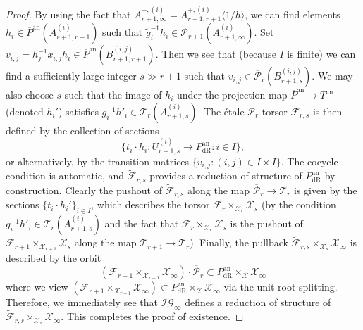 \documentclass[10pt, oneside]{amsart}
\renewcommand{\tilde}{\widetilde}
\numberwithin{equation}{subsection}
\theoremstyle{definition}
\theoremstyle{remark}
\newcommand{\opn}[1]{\operatorname{#1}}
\begin{document}
\begin{proof}
    By using the fact that $A^{+,(i)}_{r+1, \infty} = A^{+,(i)}_{r+1, r+1}\langle 1/h \rangle$, we can find elements $h_i \in \overline{P}^{\opn{an}}(A_{r+1, r+1}^{(i)})$ such that $\tilde{g}_i^{-1} h_i \in \overline{\mathcal{P}}_{r+1}(A_{r+1, \infty}^{(i)})$. Set $v_{i, j} = h_j^{-1} x_{i, j} h_i \in \overline{P}^{\opn{an}}(B_{r+1, r+1}^{(i, j)})$. Then we see that (because $I$ is finite) we can find a sufficiently large integer $s \gg r+1$ such that $v_{i, j} \in \overline{\mathcal{P}}_{r}(B_{r+1, s}^{(i, j)})$. We may also choose $s$ such that the image of $h_i$ under the projection map $\overline{P}^{\opn{an}} \to T^{\opn{an}}$ (denoted $h_i'$) satisfies $g_i^{-1}h'_i \in \mathcal{T}_r(A_{r+1, s}^{(i)})$. The \'{e}tale $\overline{\mathcal{P}}_r$-torsor $\tilde{\mathcal{F}}_{r, s}$ is then defined by the collection of sections
    \[
    \{ t_i \cdot h_i \colon U_{r+1, s}^{(i)} \to P_{\opn{dR}}^{\opn{an}} : i \in I \},
    \]
    or alternatively, by the transition matrices $\{ v_{i, j} : (i, j) \in I \times I \}$. The cocycle condition is automatic, and $\tilde{\mathcal{F}}_{r, s}$ provides a reduction of structure of $P_{\opn{dR}}^{\opn{an}}$ by construction. Clearly the pushout of $\tilde{\mathcal{F}}_{r, s}$ along the map $\overline{\mathcal{P}}_{r} \to \mathcal{T}_r$ is given by the sections $\{ t_i \cdot h_i' \}_{i \in I}$, which describes the torsor $\mathcal{F}_r \times_{\mathcal{X}_r} \mathcal{X}_s$ (by the condition $g_i^{-1}h'_i \in \mathcal{T}_r(A_{r+1, s}^{(i)})$ and the fact that $\mathcal{F}_r \times_{\mathcal{X}_r} \mathcal{X}_s$ is the pushout of $\mathcal{F}_{r+1} \times_{\mathcal{X}_{r+1}} \mathcal{X}_s$ along the map $\mathcal{T}_{r+1} \to \mathcal{T}_r$). Finally, the pullback $\tilde{\mathcal{F}}_{r, s} \times_{\mathcal{X}_s} \mathcal{X}_{\infty}$ is described by the orbit
    \[
    \left( \mathcal{F}_{r+1} \times_{\mathcal{X}_{r+1}} \mathcal{X}_{\infty} \right) \cdot \overline{\mathcal{P}}_r \subset P_{\opn{dR}}^{\opn{an}} \times_{\mathcal{X}} \mathcal{X}_{\infty}
    \]
    where we view $\left( \mathcal{F}_{r+1} \times_{\mathcal{X}_{r+1}} \mathcal{X}_{\infty} \right) \subset P_{\opn{dR}}^{\opn{an}} \times_{\mathcal{X}} \mathcal{X}_{\infty}$ via the unit root splitting. Therefore, we immediately see that $\mathcal{IG}_{\infty}$ defines a reduction of structure of $\tilde{\mathcal{F}}_{r, s} \times_{\mathcal{X}_s} \mathcal{X}_{\infty}$. This completes the proof of existence. 


\end{proof}
\end{document}
